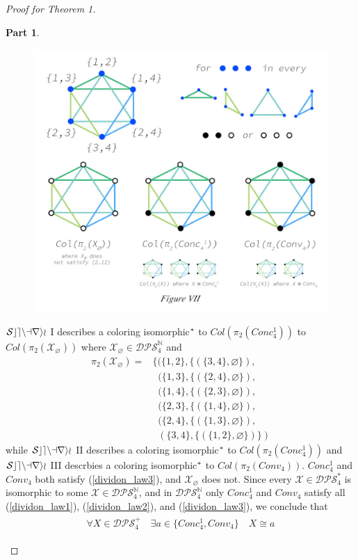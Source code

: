 \documentclass[11pt, oneside]{article}      %
\theoremstyle{definition}
\newtheorem{proofpart}{Part}[theo]
\numberwithin{equation}{section}
\newcommand{\reff}[1]{(\ref{#1})}
\theoremstyle{c}
\begin{document}
\begin{proof}[Proof for \textit{Theorem 1}]
\begin{proofpart}
\begin{figure}[!h]
\centering
\includegraphics[height=10cm]{figure_7.jpg}
\end{figure}

$\color{black} \mathcal{Scenario}$ I describes a coloring isomorphic$\color{black}^*$ to $Col(\pi_2(Conc_4^1))$ to $Col(\pi_2(\mathscr{X}_{\varnothing}))$ where $\mathscr{X}_{\varnothing} \in \mathscr{DPS}^{\mathbb{N}}_4$ and
\begin{align*}
    \pi_2(\mathscr{X}_{\varnothing}) = & \{(\{1,2\},\{(\{3,4\},\varnothing\}), \\
    &\;\; (\{1,3\},\{(\{2,4\},\varnothing\}), \\
    &\;\; (\{1,4\},\{(\{2,3\},\varnothing\}), \\
    &\;\; (\{2,3\}, \{(\{1,4\},\varnothing\}), \\
    &\;\; (\{2,4\},\{(\{1,3\},\varnothing\}), \\
    &\;\; (\{3,4\}, \{(\{1,2\},\varnothing\})\})
\end{align*}
while $\color{black}\mathcal{Scenario}$ II describes a coloring isomorphic$\color{black}^*$ to $Col(\pi_2(Conc_4^1))$ and $\color{black} \mathcal{Scenario}$ III descrbies a coloring isomorphic$\color{black}^*$ to $Col(\pi_2(Conv_4))$. $Conc_4^1$ and $Conv_4$ both satisfy \reff{dividon_law3}, and $\mathscr{X}_{\varnothing}$ does not. Since every $\mathscr{X} \in  \mathscr{DPS^\mathbb{*}_4}$ is isomorphic to some $\mathscr{X} \in \mathscr{DPS^\mathbb{N}_4}$, and in $\mathscr{DPS^\mathbb{N}_4}$ only $Conc_4^1$ and $Conv_4$ satisfy all \reff{dividon_law1}, \reff{dividon_law2}, and \reff{dividon_law3}, we conclude that
\begin{gather}\begin{split}
\forall X \in \mathscr{DPS}^{+}_4 \quad \exists a \in \{Conc_4^1,Conv_4 \} \quad X \cong a
\end{split}
\end{gather}
\end{proofpart}

\end{proof}
\end{document}
